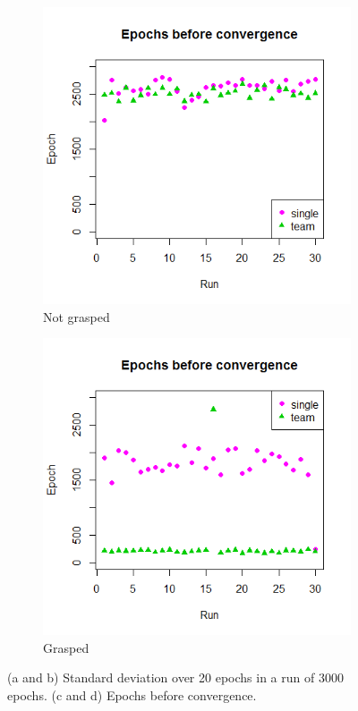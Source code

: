 \begin{figure}
\begin{subfigure}{.48\textwidth}
		\includegraphics[width=\textwidth]{images/Convergence_notgrabbed.png}
		\caption{Not grasped}
		\label{3c}		
	\end{subfigure}
	\begin{subfigure}{0.48\textwidth}
		\centering
		\includegraphics[width=\textwidth]{images/Convergence_grabbed.png}
		\caption{Grasped}
		\label{3d}		
	\end{subfigure}
	\caption{(a and b) Standard deviation over 20 epochs in a run of 3000 epochs. (c and d) Epochs before convergence.}
	\label{fig:Results3}
\end{figure}

